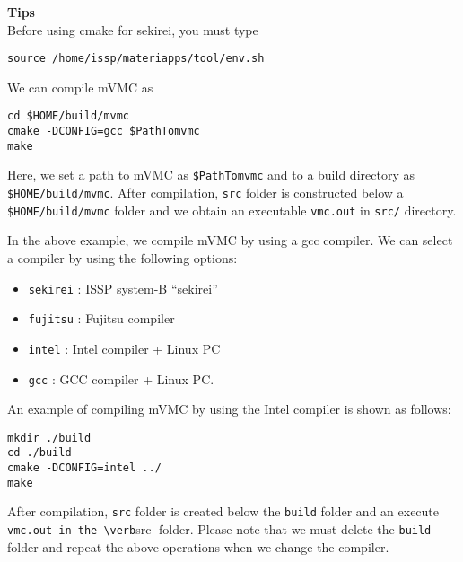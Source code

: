 \begin{screen}
\Large 
{\bf Tips}
\normalsize\\
Before using cmake for sekirei, you must type 
\begin{verbatim}
source /home/issp/materiapps/tool/env.sh
\end{verbatim}
\end{screen}

We can compile mVMC as
\begin{verbatim}
cd $HOME/build/mvmc
cmake -DCONFIG=gcc $PathTomvmc
make
\end{verbatim}
Here, we set a path to mVMC as \verb|$PathTomvmc|
and to a build directory as \verb| $HOME/build/mvmc|.
After compilation, \verb|src| folder is constructed below a \verb|$HOME/build/mvmc|
folder and we obtain an executable \verb|vmc.out| in \verb|src/| directory.

In the above example,
we compile mVMC by using a gcc compiler.
We can select a compiler by using the following options:
\begin{itemize}
\item \verb|sekirei| : ISSP system-B ``sekirei''
\item \verb|fujitsu| : Fujitsu compiler 
\item \verb|intel| : Intel compiler + Linux PC
\item \verb|gcc| : GCC compiler + Linux PC.
\end{itemize}
An example of compiling mVMC by using the Intel compiler is shown as follows:
\begin{verbatim}
mkdir ./build
cd ./build
cmake -DCONFIG=intel ../
make
\end{verbatim}
After compilation,
\verb|src| folder is created below the \verb|build| folder and
an execute \verb|vmc.out in the \verb|src| folder.
Please note that we must delete the \verb|build| folder and
repeat the above operations when we change the compiler.

\label{Sec:HowToInstall}

